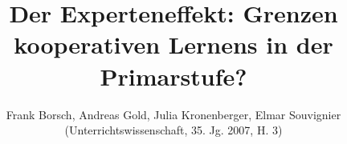 \title{Der Experteneffekt: Grenzen kooperativen Lernens in der Primarstufe?} %
\author{Frank Borsch, Andreas Gold, Julia Kronenberger, Elmar Souvignier (Unterrichtswissenschaft, 35. Jg. 2007, H. 3)} %
